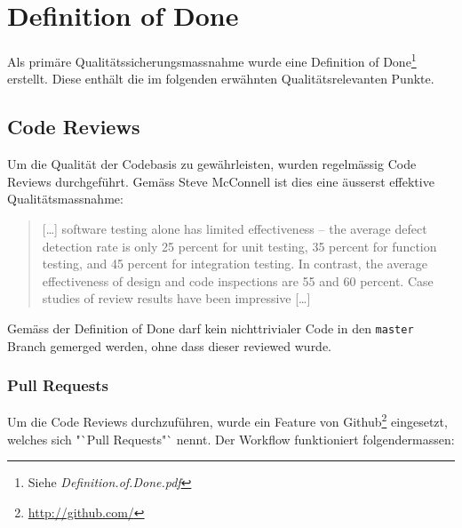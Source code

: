 \documentclass[10pt,a4paper]{scrartcl}
\begin{document}
\newpage


\section{Definition of Done}

Als primäre Qualitätssicherungsmassnahme wurde eine Definition of Done\footnote{Siehe
\textit{Definition.of.Done.pdf}} erstellt. Diese enthält die im folgenden erwähnten
Qualitätsrelevanten Punkte.

\subsection{Code Reviews}

Um die Qualität der Codebasis zu gewährleisten, wurden regelmässig Code Reviews
durchgeführt. Gemäss Steve McConnell \cite{mcconnell2005code} ist dies eine äusserst effektive
Qualitätsmassnahme:

\begin{quote}
	[\ldots{}] software testing alone has limited effectiveness -- the average defect detection rate is only 25
	percent for unit testing, 35 percent for function testing, and 45 percent for integration testing.
	In contrast, the average effectiveness of design and code inspections are 55 and 60 percent. Case
	studies of review results have been impressive [\ldots]
\end{quote}

Gemäss der Definition of Done darf kein nichttrivialer Code in den \texttt{master} Branch gemerged
werden, ohne dass dieser reviewed wurde.

\subsubsection{Pull Requests}

Um die Code Reviews durchzuführen, wurde ein Feature von Github\footnote{\url{http://github.com/}}
eingesetzt, welches sich "`Pull Requests"` nennt. Der Workflow funktioniert folgendermassen:
\end{document}
